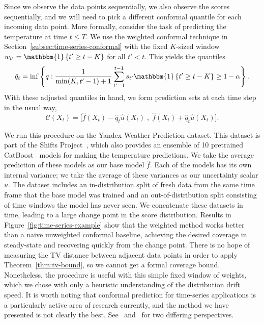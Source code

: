 \documentclass[10pt]{article}
\newcommand{\C}{\mathcal{C}}
\newcommand{\ind}[1]{\mathbbm{1}\left\{#1\right\}}
\begin{document}
Since we observe the data points sequentially, we also observe the scores sequentially, and we will need to pick a different conformal quantile for each incoming data point.
More formally, consider the task of predicting the temperature at time $t \leq T$. 
We use the weighted conformal technique in Section~\ref{subsec:time-series-conformal} with the fixed $K$-sized window $w_{t'} = \ind{t' \geq t - K}$ for all $t' < t$.
This yields the quantiles
\begin{equation}
  \hat{q}_{t} = \inf\left\{ q :  \frac{1}{\min(K,t'-1)+1}\sum\limits_{t'=1}^{t-1} s_{t'} \ind{t' \geq t - K} \geq 1-\alpha\right\}.
\end{equation}
With these adjusted quantiles in hand, we form prediction sets at each time step in the usual way,
\begin{equation}
    \C(X_{t}) = \Big[ \hat{f}(X_{t}) - \hat{q}_{t}\hat{u}(X_{t}) \; , \; \hat{f}(X_{t}) + \hat{q}_{t}\hat{u}(X_{t}) \Big].
\end{equation}

We run this procedure on the Yandex Weather Prediction dataset.
This dataset is part of the Shifts Project~\cite{malinin2021shifts}, which also provides an ensemble of 10 pretrained CatBoost~\cite{dorogush2018catboost} models for making the temperature predictions.
We take the average prediction of these models as our base model $\hat{f}$.
Each of the models has its own internal variance; we take the average of these variances as our uncertainty scalar $\hat{u}$.
The dataset includes an in-distribution split of fresh data from the same time frame that the base model was trained and an out-of-distribution split consisting of time windows the model has never seen.
We concatenate these datasets in time, leading to a large change point in the score distribution.
Results in Figure~\ref{fig:time-series-example} show that the weighted method works better than a naive unweighted conformal baseline, achieving the desired coverage in steady-state and recovering quickly from the change point.
There is no hope of measuring the TV distance between adjacent data points in order to apply Theorem~\ref{thm:tv-bound}, so we cannot get a formal coverage bound.
Nonetheless, the procedure is useful with this simple fixed window of weights, which we chose with only a heuristic understanding of the distribution drift speed.
It is worth noting that conformal prediction for time-series applications is a particularly active area of research currently, and the method we have presented is not clearly the best. See~\cite{gibbs2021adaptive,zaffran2022adaptive,gibbs2022conformal} and~\cite{xu2021conformal} for two differing perspectives.
\end{document}
